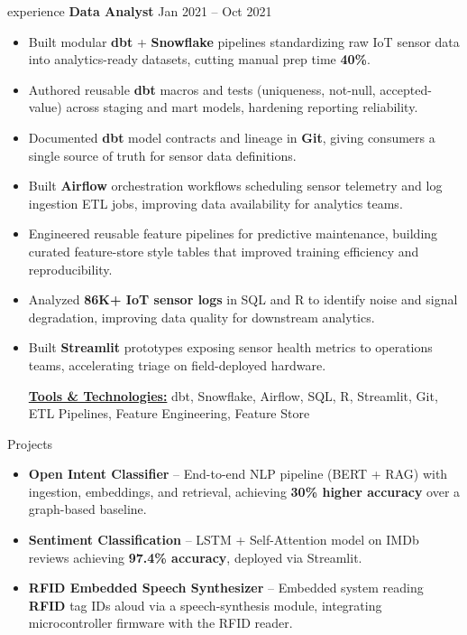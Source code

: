 \documentclass[25pt]{resume}
\begin{document}
\begin{ResumeSection}{experience}
    \textbf{Data Analyst} \hfill Jan 2021 -- Oct 2021
    \begin{itemize}
        \item Built modular \textbf{dbt} + \textbf{Snowflake} pipelines standardizing raw IoT sensor data into analytics-ready datasets, cutting manual prep time \textbf{40\%}.
        \item Authored reusable \textbf{dbt} macros and tests (uniqueness, not-null, accepted-value) across staging and mart models, hardening reporting reliability.
        \item Documented \textbf{dbt} model contracts and lineage in \textbf{Git}, giving consumers a single source of truth for sensor data definitions.
        \item Built \textbf{Airflow} orchestration workflows scheduling sensor telemetry and log ingestion ETL jobs, improving data availability for analytics teams.
        \item Engineered reusable feature pipelines for predictive maintenance, building curated feature-store style tables that improved training efficiency and reproducibility.
        \item Analyzed \textbf{86K+ IoT sensor logs} in SQL and R to identify noise and signal degradation, improving data quality for downstream analytics.
        \item Built \textbf{Streamlit} prototypes exposing sensor health metrics to operations teams, accelerating triage on field-deployed hardware.

        \vspace{0.3\baselineskip}
        {\underline{\textbf{Tools \& Technologies:}} dbt, Snowflake, Airflow, SQL, R, Streamlit, Git, ETL Pipelines, Feature Engineering, Feature Store}
    \end{itemize}
    \vspace{0.5\baselineskip}
\end{ResumeSection}

\begin{ResumeSection}{Projects}
    \begin{itemize}
        \item \textbf{Open Intent Classifier} -- End-to-end NLP pipeline (BERT + RAG) with ingestion, embeddings, and retrieval, achieving \textbf{30\% higher accuracy} over a graph-based baseline.
        \item \textbf{Sentiment Classification} -- LSTM + Self-Attention model on IMDb reviews achieving \textbf{97.4\% accuracy}, deployed via Streamlit.
        \item \textbf{RFID Embedded Speech Synthesizer} -- Embedded system reading \textbf{RFID} tag IDs aloud via a speech-synthesis module, integrating microcontroller firmware with the RFID reader.
    \end{itemize}
\end{ResumeSection}
\end{document}
